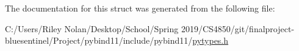The documentation for this struct was generated from the following file\+:\begin{DoxyCompactItemize}
\item 
C\+:/\+Users/\+Riley Nolan/\+Desktop/\+School/\+Spring 2019/\+C\+S4850/git/finalproject-\/bluesentinel/\+Project/pybind11/include/pybind11/\mbox{\hyperlink{pytypes_8h}{pytypes.\+h}}\end{DoxyCompactItemize}
